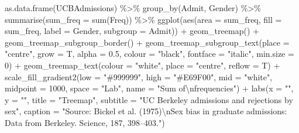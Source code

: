 \documentclass[
]{book}
\newenvironment{Shaded}{\begin{snugshade}}{\end{snugshade}}
\newcommand{\AttributeTok}[1]{\textcolor[rgb]{0.77,0.63,0.00}{#1}}
\newcommand{\DecValTok}[1]{\textcolor[rgb]{0.00,0.00,0.81}{#1}}
\newcommand{\FloatTok}[1]{\textcolor[rgb]{0.00,0.00,0.81}{#1}}
\newcommand{\FunctionTok}[1]{\textcolor[rgb]{0.00,0.00,0.00}{#1}}
\newcommand{\NormalTok}[1]{#1}
\newcommand{\SpecialCharTok}[1]{\textcolor[rgb]{0.00,0.00,0.00}{#1}}
\newcommand{\StringTok}[1]{\textcolor[rgb]{0.31,0.60,0.02}{#1}}
\begin{document}
\begin{Shaded}
\begin{Highlighting}[]
\FunctionTok{as.data.frame}\NormalTok{(UCBAdmissions) }\SpecialCharTok{\%\textgreater{}\%}
    \FunctionTok{group\_by}\NormalTok{(Admit, Gender) }\SpecialCharTok{\%\textgreater{}\%}
    \FunctionTok{summarise}\NormalTok{(}\AttributeTok{sum\_freq =} \FunctionTok{sum}\NormalTok{(Freq)) }\SpecialCharTok{\%\textgreater{}\%}
    \FunctionTok{ggplot}\NormalTok{(}\FunctionTok{aes}\NormalTok{(}\AttributeTok{area =}\NormalTok{ sum\_freq, }\AttributeTok{fill =}\NormalTok{ sum\_freq, }\AttributeTok{label =}\NormalTok{ Gender, }
               \AttributeTok{subgroup =}\NormalTok{ Admit)) }\SpecialCharTok{+}
    \FunctionTok{geom\_treemap}\NormalTok{() }\SpecialCharTok{+}
    \FunctionTok{geom\_treemap\_subgroup\_border}\NormalTok{() }\SpecialCharTok{+}
    \FunctionTok{geom\_treemap\_subgroup\_text}\NormalTok{(}\AttributeTok{place =} \StringTok{"centre"}\NormalTok{, }\AttributeTok{grow =}\NormalTok{ T, }\AttributeTok{alpha =} \FloatTok{0.5}\NormalTok{, }\AttributeTok{colour =}
                             \StringTok{"black"}\NormalTok{, }\AttributeTok{fontface =} \StringTok{"italic"}\NormalTok{, }\AttributeTok{min.size =} \DecValTok{0}\NormalTok{) }\SpecialCharTok{+}
    \FunctionTok{geom\_treemap\_text}\NormalTok{(}\AttributeTok{colour =} \StringTok{"white"}\NormalTok{, }\AttributeTok{place =} \StringTok{"centre"}\NormalTok{, }\AttributeTok{reflow =}\NormalTok{ T) }\SpecialCharTok{+}
    \FunctionTok{scale\_fill\_gradient2}\NormalTok{(}\AttributeTok{low =} \StringTok{"\#999999"}\NormalTok{, }\AttributeTok{high =} \StringTok{"\#E69F00"}\NormalTok{, }\AttributeTok{mid =} \StringTok{"white"}\NormalTok{, }\AttributeTok{midpoint =} \DecValTok{1000}\NormalTok{, }\AttributeTok{space =} \StringTok{"Lab"}\NormalTok{, }
     \AttributeTok{name =} \StringTok{"Sum of}\SpecialCharTok{\textbackslash{}n}\StringTok{frequencies"}\NormalTok{) }\SpecialCharTok{+}
      \FunctionTok{labs}\NormalTok{(}\AttributeTok{x =} \StringTok{""}\NormalTok{, }
           \AttributeTok{y =} \StringTok{""}\NormalTok{,}
          \AttributeTok{title =} \StringTok{"Treemap"}\NormalTok{, }
          \AttributeTok{subtitle =} \StringTok{"UC Berkeley admissions and rejections by sex"}\NormalTok{,}
          \AttributeTok{caption =} \StringTok{"Source: Bickel et al. (1975)}\SpecialCharTok{\textbackslash{}n}\StringTok{Sex bias in graduate admissions: Data from Berkeley. Science, 187, 398–403."}\NormalTok{)}
\end{Highlighting}
\end{Shaded}
\end{document}
